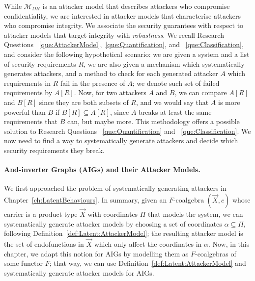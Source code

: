 While $\mathcal{M}_{DH}$ is an attacker model that describes attackers who compromise confidentiality, we are interested in attacker models that characterise attackers who compromise integrity. We associate the security guarantees with respect to attacker models that target integrity with \emph{robustness}. We recall Research Questions ~\ref{que:AttackerModel},~\ref{que:Quantification}, and ~\ref{que:Classification}, and consider the following hypothetical scenario: we are given a system and a list of security requirements ${R}$, we are also given a mechanism which systematically generates attackers, and a method to check for each generated attacker $A$ which requirements in ${R}$ fail in the presence of $A$; we denote such set of failed requirements by $A[{R}]$. Now, for two attackers $A$ and $B$, we can compare $A[{R}]$ and $B[{R}]$ since they are both subsets of $R$, and we would say that $A$ is more powerful than $B$ if $B[{R}]\subseteq A[{R}]$, since $A$ breaks at least the same requirements that $B$ can, but maybe more. This methodology offers a possible solution to Research Questions ~\ref{que:Quantification} and ~\ref{que:Classification}. We now need to find a way to systematically generate attackers and decide which security requirements they break. 

\paragraph{And-inverter Graphs (AIGs) and their Attacker Models.} We first approached the problem of systematically generating attackers in Chapter~\ref{ch:LatentBehaviours}. In summary, given an $F$-coalgebra $(\vec{X},c)$ whose carrier is a product type $\vec{X}$ with coordinates $\Pi$ that models the system, we can systematically generate attacker models by choosing a set of coordinates $\alpha\subseteq \Pi$, following Definition~\ref{def:Latent:AttackerModel}; the resulting attacker model is the set of endofunctions in $\vec{X}$ which only affect the coordinates in $\alpha$. Now, in this chapter, we adapt this notion for AIGs by modelling them as $F$-coalgebras of some functor $F$; that way, we can use Definition~\ref{def:Latent:AttackerModel} and systematically generate attacker models for AIGs. 

